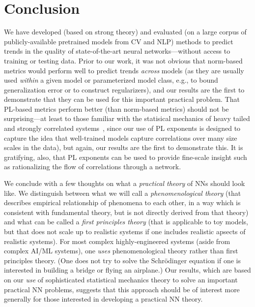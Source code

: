 \section{Conclusion}
\label{sxn:conc}

We have developed (based on strong theory) and evaluated (on a large corpus of publicly-available pretrained models from CV and NLP) methods to predict trends in the quality of state-of-the-art neural networks---without access to training or testing data.
Prior to our work, it was not obvious that norm-based metrics would perform well to predict trends \emph{across} models (as they are usually used \emph{within} a given model or parameterized model class, e.g., to bound generalization error or to construct regularizers), and our results are the first to demonstrate that they can be used for this important practical problem.
That PL-based metrics perform better (than norm-based metrics) should not be surprising---at least to those familiar with the statisical mechanics of heavy tailed and strongly correlated systems~\cite{BouchaudPotters03, SornetteBook, BP11, bun2017}, since our use of PL exponents is designed to capture the idea that well-trained models capture correlations over many size scales in the data), but again,  our results are the first to demonstrate this.
It is gratifying, also, that PL exponents can be used to provide fine-scale insight such as rationalizing the flow of correlations through a network. 

We conclude with a few thoughts on what a \emph{practical theory} of NNs should look like.
%
We distinguish between what we will call a
\emph{phenomenological theory}
(that describes empirical relationship of phenomena to each other, in a way which is consistent with fundamental theory, but is not directly derived from that theory)
and what can be called a 
\emph{first principles theory} 
(that is applicable to toy models, but that does not scale up to realistic systems if one includes realistic apsects of realistic systems).
%
For most complex highly-engineered systems (aside from complex AI/ML systems), one \emph{uses} phenomenological theory rather than first principles theory. 
(One does not try to solve the Schr\"odinger equation if one is interested in building a bridge or flying an airplane.)
%
Our results, which are based on our \emph{use} of sophisticated statistical mechanics theory to solve an important practical NN problems, suggests that this approach should be of interest more generally for those interested in developing a practical NN theory.



